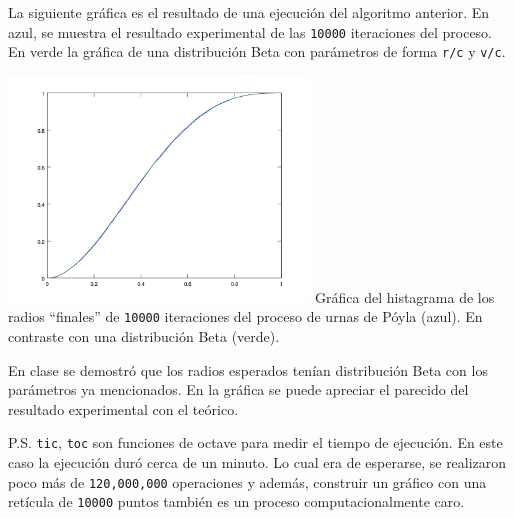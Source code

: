La siguiente gráfica es el resultado de una ejecución del algoritmo anterior. En azul, se 
muestra el resultado experimental de las \texttt{10000} iteraciones del proceso. En verde 
la gráfica de una distribución Beta con parámetros de forma \texttt{r/c} y \texttt{v/c}.\pn

\begin{center}
    \includegraphics[width=8cm]{tarea3/problema3_4/poylaBeta.PNG}\pn
    Gr\'afica del histagrama de los radios ``finales'' de \texttt{10000} iteraciones del proceso 
	de urnas de P\'oyla (azul). En contraste con una distribución Beta (verde).\pn
\end{center}

En clase se demostró que los radios esperados tenían distribución Beta con los parámetros 
ya mencionados. En la gráfica se puede apreciar el parecido del resultado experimental con el teórico.\pn

P.S. \texttt{tic}, \texttt{toc} son funciones de octave para medir el tiempo de ejecución. En este caso
la ejecución duró cerca de un minuto. Lo cual era de esperarse, se realizaron poco más de \texttt{120,000,000} operaciones
y además, construir un gráfico con una retícula de \texttt{10000} puntos también es un proceso computacionalmente caro.
